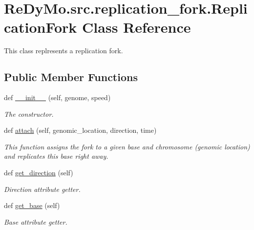 \hypertarget{classReDyMo_1_1src_1_1replication__fork_1_1ReplicationFork}{}\section{Re\+Dy\+Mo.\+src.\+replication\+\_\+fork.\+Replication\+Fork Class Reference}
\label{classReDyMo_1_1src_1_1replication__fork_1_1ReplicationFork}


This class replresents a replication fork.  


\subsection*{Public Member Functions}
\begin{DoxyCompactItemize}
\item 
def \mbox{\hyperlink{classReDyMo_1_1src_1_1replication__fork_1_1ReplicationFork_a33deb5c1f40c77b4c2d0ad873865ae20}{\+\_\+\+\_\+init\+\_\+\+\_\+}} (self, genome, speed)
\begin{DoxyCompactList}\small\item\em The constructor. \end{DoxyCompactList}\item 
def \mbox{\hyperlink{classReDyMo_1_1src_1_1replication__fork_1_1ReplicationFork_a616af5a3e5cb32dfad3023df09dffee2}{attach}} (self, genomic\+\_\+location, direction, time)
\begin{DoxyCompactList}\small\item\em This function assigns the fork to a given base and chromosome (genomic location) and replicates this base right away. \end{DoxyCompactList}\item 
def \mbox{\hyperlink{classReDyMo_1_1src_1_1replication__fork_1_1ReplicationFork_a8c78154d928c20a98cc1487aabab027a}{get\+\_\+direction}} (self)
\begin{DoxyCompactList}\small\item\em Direction attribute getter. \end{DoxyCompactList}\item 
def \mbox{\hyperlink{classReDyMo_1_1src_1_1replication__fork_1_1ReplicationFork_af49d73c45344c7ede5b77002d343d8d7}{get\+\_\+base}} (self)
\begin{DoxyCompactList}\small\item\em Base attribute getter. \end{DoxyCompactList}\item 

\end{DoxyCompactItemize}
